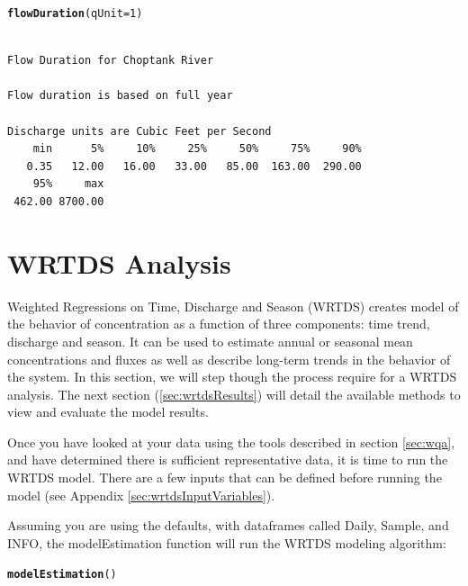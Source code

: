 \documentclass[a4paper,11pt]{article}\usepackage[]{graphicx}\usepackage[]{color}
\makeatletter
\newcommand{\hlnum}[1]{\textcolor[rgb]{0.686,0.059,0.569}{#1}}%
\newcommand{\hlstd}[1]{\textcolor[rgb]{0.345,0.345,0.345}{#1}}%
\newcommand{\hlkwc}[1]{\textcolor[rgb]{0.333,0.667,0.333}{#1}}%
\newcommand{\hlkwd}[1]{\textcolor[rgb]{0.737,0.353,0.396}{\textbf{#1}}}%
\newenvironment{kframe}{%
 \def\at@end@of@kframe{}%
 \ifinner\ifhmode%
  \def\at@end@of@kframe{\end{minipage}}%
  \begin{minipage}{\columnwidth}%
 \fi\fi%
 \def\FrameCommand##1{\hskip\@totalleftmargin \hskip-\fboxsep
 \colorbox{shadecolor}{##1}\hskip-\fboxsep
     \hskip-\linewidth \hskip-\@totalleftmargin \hskip\columnwidth}%
 \MakeFramed {\advance\hsize-\width
   \@totalleftmargin\z@ \linewidth\hsize
   \@setminipage}}%
 {\par\unskip\endMakeFramed%
 \at@end@of@kframe}
\newenvironment{knitrout}{}{} %
\makeatother
\begin{document}
\begin{knitrout}
\color{fgcolor}\begin{kframe}
\begin{alltt}
\hlkwd{flowDuration}\hlstd{(}\hlkwc{qUnit}\hlstd{=}\hlnum{1}\hlstd{)}
\end{alltt}
\begin{verbatim}

Flow Duration for Choptank River 

Flow duration is based on full year

Discharge units are Cubic Feet per Second 
    min      5%     10%     25%     50%     75%     90% 
   0.35   12.00   16.00   33.00   85.00  163.00  290.00 
    95%     max 
 462.00 8700.00 
\end{verbatim}
\end{kframe}
\end{knitrout}


\FloatBarrier
\section{WRTDS Analysis}
\label{sec:wrtds}
Weighted Regressions on Time, Discharge and Season (WRTDS) creates model of the behavior of concentration as a function of three components: time trend, discharge and season.  It can be used to estimate annual or seasonal mean concentrations and fluxes as well as describe long-term trends in the behavior of the system. In this section, we will step though the process require for a WRTDS analysis. The next section (\ref{sec:wrtdsResults}) will detail the available methods to view and evaluate the model results. 

Once you have looked at your data using the tools described in section \ref{sec:wqa}, and have determined there is sufficient representative data, it is time to run the WRTDS model. There are a few inputs that can be defined before running the model (see Appendix \ref{sec:wrtdsInputVariables}).

Assuming you are using the defaults, with dataframes called Daily, Sample, and INFO, the modelEstimation function will run the WRTDS modeling algorithm:

\begin{knitrout}
\color{fgcolor}\begin{kframe}
\begin{alltt}
\hlkwd{modelEstimation}\hlstd{()}
\end{alltt}
\end{kframe}
\end{knitrout}
\end{document}
